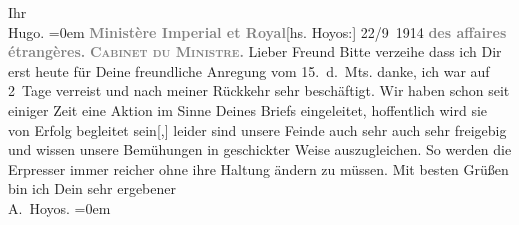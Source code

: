 \begin{ledgroupsized}[t]{13cm}
           \pstart
           Ihr{\\[\baselineskip]}\spacefill\mbox{Hugo.}\pend
           \leftskip=0em{}{\bigskip}\pstart
           \noindent{}{\pb}\textcolor{gray}{\textbf{Ministère Imperial et Royal}}\hfill {[}hs. Hoyos:{]} 22/9 1914\pend
           \pstart
           \textcolor{gray}{\textbf{des affaires étrangères.}}\pend
           \pstart
           \textcolor{gray}{\textbf{\textsc{Cabinet du Ministre.}}}\pend
           \pstart{}Lieber Freund\pend\pstart
           Bitte verzeihe dass ich Dir erst heute für Deine freundliche Anregung vom
                  15. d. Mts. danke, ich war auf 2 Tage verreist und nach meiner
               Rückkehr sehr beschäftigt. Wir haben schon seit einiger Zeit eine Aktion im Sinne
               Deines Briefs {\pb}eingeleitet,
               hoffentlich wird sie von Erfolg begleitet sein{[},{]} leider sind
               unsere Feinde auch sehr auch sehr freigebig und wissen unsere Bemühungen in
               geschickter Weise auszugleichen. So werden die Erpresser immer reicher ohne ihre
               Haltung ändern zu müssen.\pend
           \pstart
           Mit besten Grüßen bin ich {\pb}Dein sehr ergebener {\\[\baselineskip]}\spacefill\mbox{A. Hoyos.}\pend
           \leftskip=0em{}
         
         \endnumbering{}\end{ledgroupsized}  \newcommand{\dateiname}{L02197}\newcommand{\titel}{Hugo von Hofmannsthal an Arthur Schnitzler, 24. 9. [1914]}\newcommand{\editorInnen}{Martin Anton Müller und Gerd-Hermann Susen}
      